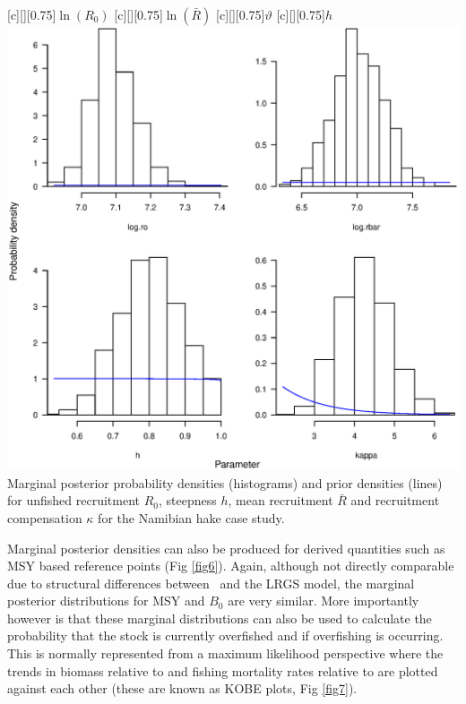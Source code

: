 \begin{multicols}{2}
\begin{figurehere}
	\centering
	[][0.75]{$\ln(R_0)$}
	[][0.75]{$\ln(\bar{R})$}
	[][0.75]{$\vartheta$}
	[][0.75]{$h$}
	\includegraphics[width=\columnwidth]{iscamFigs/fig5.eps}\\
	\caption{Marginal posterior probability densities (histograms) and prior densities (lines) for unfished recruitment $R_0$, steepness $h$, mean recruitment $\bar{R}$ and recruitment compensation $\kappa$ for the Namibian hake case study.}\label{fig5}
\end{figurehere}

Marginal posterior densities can also be produced for derived quantities such as MSY based reference points (Fig \ref{fig6}).   Again, although not directly comparable due to structural differences between \iscam\ and the LRGS model, the marginal posterior distributions for MSY and $B_0$ are very similar.  More importantly however is that these marginal distributions can also be used to calculate the probability that the stock is currently overfished and if overfishing is occurring.  This is normally represented from a maximum likelihood perspective where the trends in biomass relative to \bmsy and fishing mortality rates relative to \fmsy are plotted against each other (these are known as KOBE plots, Fig \ref{fig7}).


\end{multicols}
